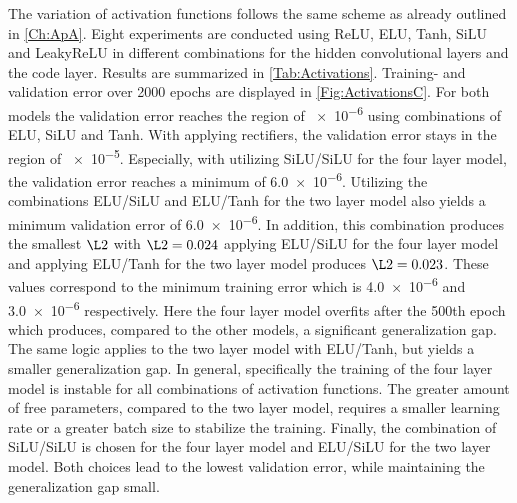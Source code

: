 The variation of activation functions follows the same scheme as already outlined in \cref{Ch:ApA}. Eight experiments are conducted using ReLU, ELU, Tanh, SiLU and LeakyReLU in different combinations for the hidden convolutional layers and the code layer. Results are summarized in \cref{Tab:Activations}. Training- and validation error over 2000 epochs are displayed in \cref{Fig:ActivationsC}. For both models the validation error reaches the region of \num{e-6} using combinations of ELU, SiLU and Tanh. With applying rectifiers, the validation error stays in the region of \num{e-5}. Especially, with utilizing SiLU/SiLU for the four layer model, the validation error reaches a minimum of \num{6.0e-6}. Utilizing the combinations ELU/SiLU and ELU/Tanh for the two layer model also yields a minimum validation error of \num{6.0e-6}. In addition, this combination produces the smallest \(\L2\) with \(\L2=0.024\) applying ELU/SiLU for the four layer model and applying ELU/Tanh for the two layer model produces \(\L2=0.023\). These values correspond to the minimum training error which is \num{4.0e-6} and \num{3.0e-6} respectively. Here the four layer model overfits after the 500th epoch which produces, compared to the other models, a significant generalization gap. The same logic applies to the two layer model with ELU/Tanh, but yields a smaller generalization gap. In general, specifically the training of the four layer model is instable for all combinations of activation functions. The greater amount of free parameters, compared to the two layer model, requires a smaller learning rate or a greater batch size to stabilize the training. Finally, the combination of SiLU/SiLU is chosen for the four layer model and ELU/SiLU for the two layer model. Both choices lead to the lowest validation error, while maintaining the generalization gap small.\\
